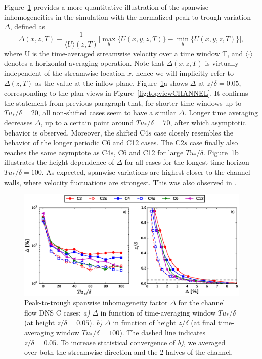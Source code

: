 		Figure~\ref{fig:delta_factorCHANNEL} provides a more quantitative illustration of the spanwise inhomogeneities in the simulation with the normalized peak-to-trough variation $\Delta$, defined as
		\begin{equation}
		\Delta(x,z,T) \equiv \frac{1}{\langle U \rangle (z,T)} \bigg [ \max_y \{ U(x,y,z,T) \} - \min_y \{ U(x,y,z,T)  \}  \bigg ],
		\end{equation}
		where U is the time-averaged streamwise velocity over a time window T, and $\langle \cdot \rangle$ denotes a horizontal averaging operation. Note that $\Delta(x,z,T)$ is virtually independent of the streamwise location $x$, hence we will implicitly refer to $\Delta(z,T)$ as the value at the inflow plane. Figure~\ref{fig:delta_factorCHANNEL}a shows $\Delta$ at $z/\delta = 0.05$, corresponding to the plan views in Figure~\ref{fig:topviewCHANNEL}. It confirms the statement from previous paragraph that, for shorter time windows up to $Tu_*/\delta = 20$, all non-shifted cases seem to have a similar $\Delta$. Longer time averaging decreases $\Delta$, up to a certain point around $Tu_*/\delta = 70$, after which asymptotic behavior is observed. Moreover, the shifted C4$s$ case closely resembles the behavior of the longer periodic C6 and C12 cases. The C2$s$ case finally also reaches the same asymptote as C4$s$, C6 and C12 for large $Tu_*/\delta$. Figure~\ref{fig:delta_factorCHANNEL}b illustrates the height-dependence of $\Delta$ for all cases for the longest time-horizon $Tu_*/\delta = 100$. As expected, spanwise variations are highest closer to the channel walls, where velocity fluctuations are strongest. This was also observed in \cite{fishpool2009persistent}.
		
		\begin{figure}
			\centering
			\includegraphics[width=\textwidth, trim= 0cm 0.15cm 0cm 0.cm,clip]{chapters/turbulent_inflow/spbc/figure5}
			\caption{Peak-to-trough spanwise inhomogeneity factor $\Delta$ for the channel flow DNS C cases: \emph{a)} $\Delta$ in function of time-averaging window $Tu_*/\delta$ (at height $z/\delta = 0.05$). \emph{b)} $\Delta$ in function of height $z/\delta$ (at final time-averaging window $Tu_*/\delta = 100$). The dashed line indicates $z/\delta = 0.05$. To increase statistical convergence of \emph{b)}, we averaged over both the streamwise direction and the 2 halves of the channel. }
			\label{fig:delta_factorCHANNEL}
		\end{figure}
		
